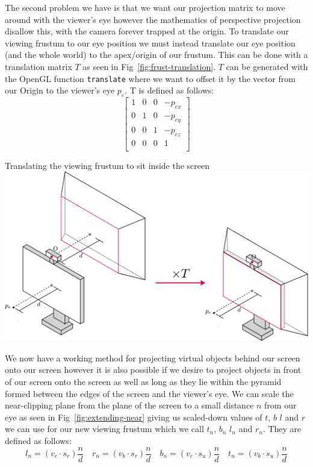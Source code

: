 The second problem we have is that we want our projection matrix to move around with the viewer's eye however the mathematics of perspective projection disallow this, with the camera forever trapped at the origin. To translate our viewing frustum to our eye position we must instead translate our eye position (and the whole world) to the apex/origin of our frustum. This can be done with a translation matrix $T$ as seen in Fig~\ref{fig:frust-translation}. $T$ can be generated with the OpenGL function \texttt{translate} where we want to offset it by the vector from our Origin to the viewer's eye $p_e$. T is defined as follows:
\[
    \begin{bmatrix}
        1 & 0 & 0 & -p_{ex} \\
        0 & 1 & 0 & -p_{ey} \\
        0 & 0 & 1 & -p_{ez} \\
        0 & 0 & 0 & 1       \\
    \end{bmatrix}
\]

\begin{figureBox}[label={fig:frust-translation}, width=0.8\linewidth]{Translating the viewing frustum to sit inside the screen}
    \includegraphics[width = 0.8\linewidth]{./background/figures/projection/frust-translation.pdf}
\end{figureBox}

We now have a working method for projecting virtual objects behind our screen onto our screen however it is also possible if we desire to project objects in front of our screen onto the screen as well as long as they lie within the pyramid formed between the edges of the screen and the viewer's eye. We can scale the near-clipping plane from the plane of the screen to a small distance $n$ from our eye as seen in Fig~\ref{fig:extending-near} giving us scaled-down values of $t$, $b$ $l$ and $r$ we can use for our new viewing frustum which we call $t_n$, $b_n$ $l_n$ and $r_n$. They are defined as follows:
\[
    l_n = (v_c \cdot s_r) \frac{n}{d} \quad r_n = (v_b \cdot s_r) \frac{n}{d} \quad b_n = (v_c \cdot s_u) \frac{n}{d} \quad t_n = (v_b \cdot s_u) \frac{n}{d}
\]


